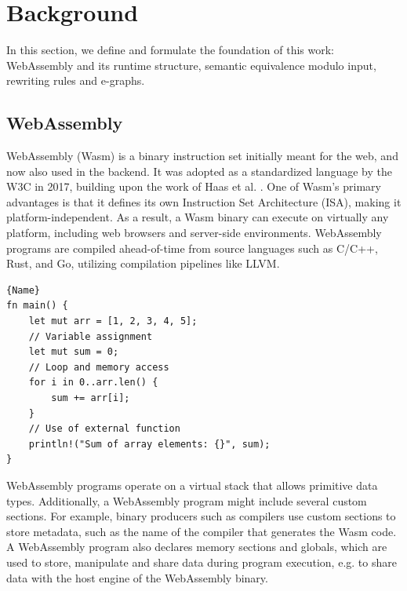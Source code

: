 \documentclass[a4paper,fleqn]{cas-dc}
\begin{document}
\section{Background}
\label{background}

In this section, we define and formulate the foundation of this work: WebAssembly and its runtime structure, semantic equivalence modulo input, rewriting rules and e-graphs.

\subsection{WebAssembly}

WebAssembly (Wasm) is a binary instruction set initially  meant for the web, and now also used in the backend. 
It was adopted as a standardized language by the W3C in 2017, building upon the work of Haas et al. \cite{haas2017bringing}. One of Wasm's primary advantages is that it defines its own Instruction Set Architecture (ISA), making it platform-independent. 
As a result, a Wasm binary can execute on virtually any platform, including web browsers and server-side environments. 
WebAssembly programs are compiled ahead-of-time from source languages such as C/C++, Rust, and Go, utilizing compilation pipelines like LLVM. 

{
\begin{lstlisting}[label=example:cprogram,caption={A Rust program containing function declaration, loop, conditional and memory access.},captionpos=b]{Name}
fn main() {
    let mut arr = [1, 2, 3, 4, 5];
    // Variable assignment
    let mut sum = 0;
    // Loop and memory access
    for i in 0..arr.len() {
        sum += arr[i];
    }
    // Use of external function
    println!("Sum of array elements: {}", sum);
}
\end{lstlisting}   
}



WebAssembly programs operate on a virtual stack that allows primitive data types.
Additionally, a WebAssembly program might include several custom sections.
For example, binary producers such as compilers use custom sections to store metadata, such as the name of the compiler that generates the Wasm code.
A WebAssembly program also declares memory sections and globals, which are used to store, manipulate and share data during program execution, e.g. to share data with the host engine of the WebAssembly binary.
\end{document}
